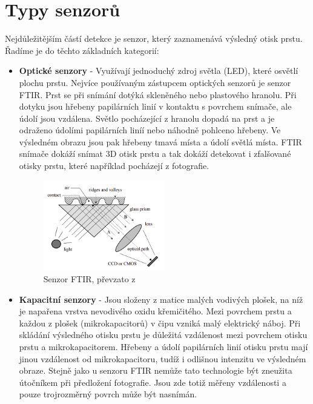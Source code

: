 \section{Typy senzorů}
Nejdůležitějším částí detekce je senzor, který zaznamenává výsledný otisk prstu. Řadíme je do těchto základních kategorií:
\begin{itemize}
\item \textbf{Optické senzory} - Využívají jednoduchý zdroj světla (LED), které osvětlí plochu prstu. \cite{Drahansky} Nejvíce používaným zástupcem optických senzorů je senzor FTIR. Prst se při snímání dotýká skleněného nebo plastového hranolu. Při dotyku jsou hřebeny papilárních linií v kontaktu s povrchem snímače, ale údolí jsou vzdálena. Světlo pocházející z hranolu dopadá na prst a je odraženo údolími papilárních liníí nebo náhodně pohlceno hřebeny. Ve výsledném obrazu jsou pak hřebeny tmavá místa a údolí světlá místa. FTIR snímače dokáží snímat 3D otisk prstu a tak dokáží detekovat i zfalšované otisky prstu, které například pocházejí z fotografie. \cite{Maltoni2009}

\begin{figure}[!htbp]
    \centering
    \includegraphics[width=200px]{obrazky-figures/ftiredit.png}
    \caption{Senzor FTIR, převzato z \cite{Maltoni2009}}
\end{figure}

\item \textbf{Kapacitní senzory} - Jsou složeny z matice malých vodivých plošek, na níž je napařena vrstva nevodivého oxidu křemičitého. \cite{Drahansky} Mezi povrchem prstu a každou z plošek (mikrokapacitorů) v čipu vzniká malý elektrický náboj. Při skládání výsledného otisku prstu je důležitá vzdálenost mezi povrchem otisku prstu a mikrokapacitorem. Hřebeny a údolí papilárních linií otisku prstu mají jinou vzdálenost od mikrokapacitoru, tudíž i odlišnou intenzitu ve výsledném obraze. Stejně jako u senzoru FTIR nemůže tato technologie být zneužita útočníkem při předložení fotografie. Jsou zde totiž měřeny vzdálenosti a pouze trojrozměrný povrch může být nasnímán. \cite{Maltoni2009}


\end{itemize}
